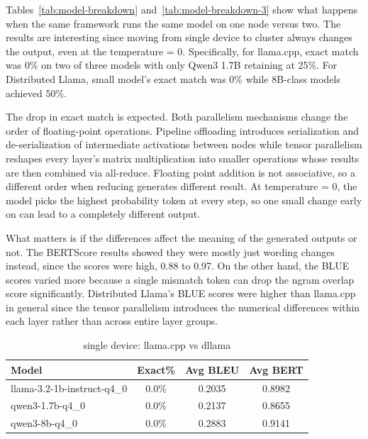 Tables~\ref{tab:model-breakdown} and~\ref{tab:model-breakdown-3} show what happens when
the same framework runs the same model on one node versus two. The results are interesting since moving from single device to cluster always changes the output, even at the temperature = 0. Specifically, for llama.cpp, exact match was 0\% on two of three models with only Qwen3 1.7B retaining at 25\%. For Distributed Llama, small model's exact match was 0\% while 8B-class models achieved 50\%.

The drop in exact match is expected. Both parallelism mechanisms change the order of floating-point operations. Pipeline offloading introduces serialization and de-serialization of intermediate activations between nodes while tensor parallelism reshapes every layer's matrix multiplication into smaller operations whose results are then combined via all-reduce. Floating point addition is not associative, so a different order when reducing generates different result. At temperature = 0, the model picks the highest probability token at every step, so one small change early on can lead to a completely different output.

What matters is if the differences affect the meaning of the generated outputs or not. The BERTScore results showed they were mostly just wording changes instead, since the scores were high, 0.88 to 0.97. On the other hand, the BLUE scores varied more because a single mismatch token can drop the n\-gram overlap score significantly. Distributed Llama's BLUE scores were higher than llama.cpp in general since the tensor parallelism introduces the numerical differences within each layer rather than across entire layer groups.
\begin{table}[htbp]
\centering
\caption{single device: llama.cpp vs dllama}
\label{tab:model-breakdown-2}
\begin{tabular}{lccc}
\hline
\textbf{Model} & \textbf{Exact\%} & \textbf{Avg BLEU} & \textbf{Avg BERT} \\ 
\hline
llama-3.2-1b-instruct-q4\_0 & 0.0\% & 0.2035 & 0.8982 \\
qwen3-1.7b-q4\_0            & 0.0\% & 0.2137 & 0.8655 \\
qwen3-8b-q4\_0              & 0.0\% & 0.2883 & 0.9141 \\ 
\hline
\end{tabular}
\end{table}


